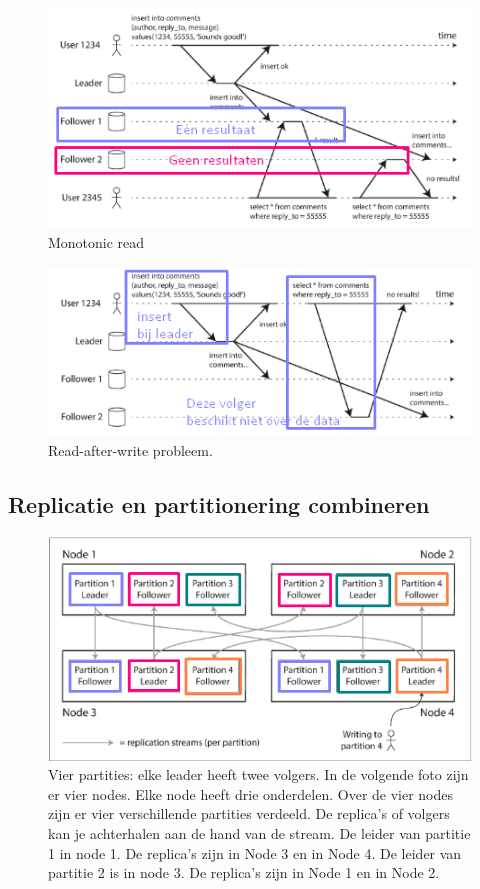 \documentclass[a4paper,10pt,twoside]{report}
\begin{document}
\begin{figure}
	\includegraphics[width=\linewidth]{../images/Screenshot_213.png}
	\caption{Monotonic read}
\end{figure}

\begin{figure}
	\includegraphics[width=\linewidth]{../images/Screenshot_214.png}
	\caption{Read-after-write probleem.}
\end{figure}

\subsection{Replicatie en partitionering combineren}



\begin{figure}
	\includegraphics[width=\linewidth]{../images/Screenshot_215.png}
	\caption{Vier partities: elke leader heeft twee volgers. In de volgende foto zijn er vier nodes. Elke node heeft drie onderdelen. Over de vier nodes zijn er vier verschillende partities verdeeld. De replica's of volgers kan je achterhalen aan de hand van de stream. De leider van partitie 1 in node 1. De replica's zijn in Node 3 en in Node 4. De leider van partitie 2 is in node 3. De replica's zijn in Node 1 en in Node 2.}
\end{figure}
\end{document}
